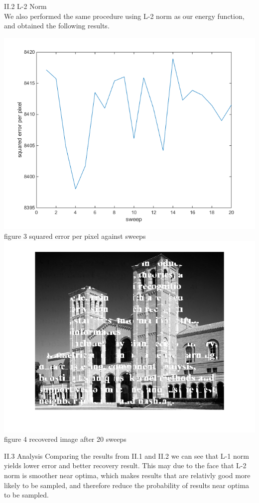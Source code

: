 \documentclass[12pt]{article}
\newenvironment{problem}[2][Part]{\begin{trivlist}
\item[\hskip \labelsep {\bfseries #1}\hskip \labelsep {\bfseries #2}]}{\end{trivlist}}
\begin{document}
\begin{problem}{II Gibbs Sampler}
\item{II.2 L-2 Norm\\}
We also performed the same procedure using L-2 norm as our energy function, and obtained the following results.
\begin{center}
	\includegraphics[width=14cm]{results/error_gibbs_l2.png}{\\figure 3 squared error per pixel against sweeps}
	\includegraphics[width=14cm]{results/gibbs_recover_l2.png}{\\figure 4 recovered image after 20 sweeps}
\end{center}

\item{II.3 Analysis}
Comparing the results from II.1 and II.2 we can see that L-1 norm yields lower error and better recovery result. This may due to the face that L-2 norm is smoother near optima, which makes results that are relativly good more likely to be sampled, and therefore reduce the probability of results near optima to be sampled.
\end{problem}
\end{document}
